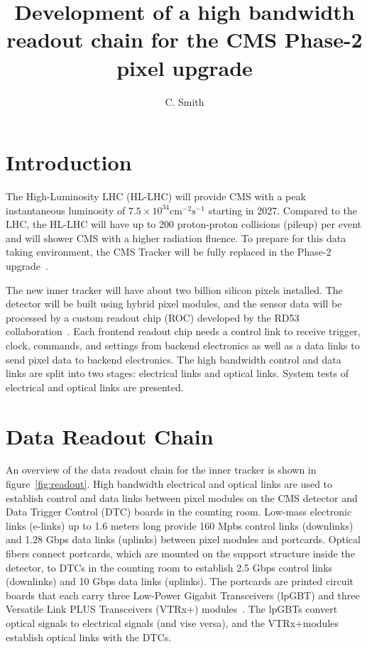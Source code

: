 \documentclass[a4paper,11pt]{article}
\title{Development of a high bandwidth readout chain for the CMS Phase-2 pixel upgrade}
\author{C. Smith}
\affiliation{The University of Kansas,\\Lawrence, Kansas 66045, USA}
\newcommand{\vtrxp}{VTRx+}
\begin{document}
\maketitle
\flushbottom


\section{Introduction}
\label{sec:introduction}

The High-Luminosity LHC (HL-LHC) will provide CMS with a peak instantaneous luminosity of $7.5 \times 10^{34} \mathrm{cm}^{-2} \mathrm{s}^{-1}$ starting in 2027.
Compared to the LHC, the HL-LHC will have up to 200 proton-proton collisions (pileup) per event and will shower CMS with a higher radiation fluence.
To prepare for this data taking environment, the CMS Tracker will be fully replaced in the Phase-2 upgrade~\cite{ref:tdr,ref:orfanelli}.

The new inner tracker will have about two billion silicon pixels installed.
The detector will be built using hybrid pixel modules, and the sensor data will be processed by a custom readout chip (ROC) developed by the RD53 collaboration~\cite{ref:rd53}.
Each frontend readout chip needs a control link to receive trigger, clock, commands, and settings from backend electronics as well as a data links to send pixel data to backend electronics.
The high bandwidth control and data links are split into two stages: electrical links and optical links.
System tests of electrical and optical links are presented.

\section{Data Readout Chain}
\label{sec:readout}

An overview of the data readout chain for the inner tracker is shown in figure~\ref{fig:readout}.
High bandwidth electrical and optical links are used to establish control and data links between pixel modules on the CMS detector and Data Trigger Control (DTC) boards in the counting room.
Low-mass electronic links (e-links) up to 1.6 meters long provide 160 Mpbs control links (downlinks) and 1.28 Gbps data links (uplinks) between pixel modules and portcards.
Optical fibers connect portcards, which are mounted on the support structure inside the detector, to DTCs in the counting room to establish 2.5 Gbps control links (downlinks) and 10 Gbps data links (uplinks).
The portcards are printed circuit boards that each carry three Low-Power Gigabit Transceivers (lpGBT) and three Versatile Link PLUS Transceivers (\vtrxp) modules~\cite{ref:lpgbt,ref:vtrxp}.
The lpGBTs convert optical signals to electrical signals (and vise versa), and the \vtrxp\space modules establish optical links with the DTCs.
\end{document}

